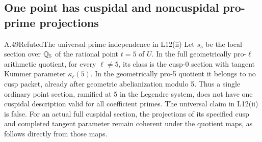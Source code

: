 \subsection{One point has cuspidal and noncuspidal pro-prime projections}

\begin{statement}{A.49}{Refuted}{The universal prime independence in L12(ii)}
Let $s_5$ be the local section over $\mathbb Q_5$ of the rational point
$t=5$ of $U$.  In the full geometrically pro-$\ell$ arithmetic
quotient, for every $\ell\ne5$, its class is the cusp-0 section
with tangent Kummer parameter $\kappa_\ell(5)$.  In the
geometrically pro-5 quotient it belongs to no cusp packet, already
after geometric abelianization modulo 5.
Thus a single ordinary point section, ramified at 5 in the
Legendre system, does not have one cuspidal description valid for
all coefficient primes.  The universal claim in L12(ii) is false.
For an actual full cuspidal section, the projections of its
specified cusp and completed tangent parameter remain coherent
under the quotient maps, as follows directly from those maps.
\end{statement}
